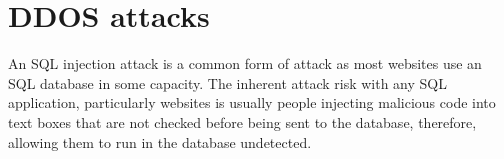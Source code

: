 
\section{DDOS attacks} \label{attack2}
An SQL injection attack is a common form of attack as most websites use an SQL database in some capacity. The inherent attack risk with any SQL application, particularly websites is usually people injecting malicious code into text boxes that are not checked before being sent to the database, therefore, allowing them to run in the database undetected.